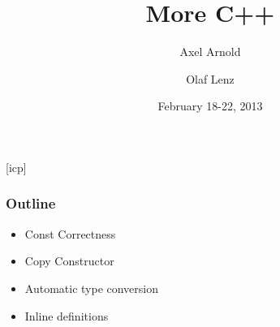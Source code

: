 \documentclass{slides}
\begin{document}
\graphicspath{{figures/}}

\title[More C++]{\Large More C++}

\author[A. Arnold and O. Lenz]{Axel Arnold \and Olaf Lenz} 
\date{February 18-22, 2013}

\begin{frame}
  \titlepage
\end {frame}
[icp]

\begin{frame}
  \frametitle{Outline}
  \begin{itemize}
  \item Const Correctness
  \item Copy Constructor
  \item Automatic type conversion
  \item Inline definitions
  \end{itemize}
\end{frame}
\end{document}
